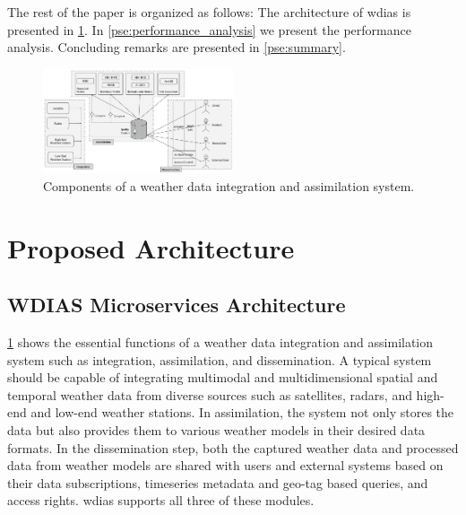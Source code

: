 \documentclass[conference]{IEEEtran}
\begin{document}
The rest of the paper is organized as follows: The architecture of \acrshort{wdias} is presented in \cref{pse:wdias_architecture}. In \cref{pse:performance_analysis} we present the performance analysis. Concluding remarks are presented in \cref{pse:summary}.


\begin{figure}[!tb]
\centerline{\includegraphics[width=0.5\textwidth]{images/weather_data_system_components_p1.pdf}}
\caption{Components of a weather data integration and assimilation system.}
\label{pfi:wdia_components}
\end{figure}

\section{Proposed Architecture}
\label{pse:wdias_architecture}

\subsection{WDIAS Microservices Architecture}
\label{psubse:wdias_microservices}

\cref{pfi:wdia_components} shows the essential functions of a weather data integration and assimilation system such as integration, assimilation, and dissemination. A typical system should be capable of integrating multimodal and multidimensional spatial and temporal weather data from diverse sources such as satellites, radars, and high-end and low-end weather stations. In assimilation, the system not only stores the data but also provides them to various weather models in their desired data formats. In the dissemination step, both the captured weather data and processed data from weather models are shared with users and external systems based on their data subscriptions, timeseries metadata and geo-tag based queries, and access rights. \acrshort{wdias} supports all three of these modules.
\end{document}
